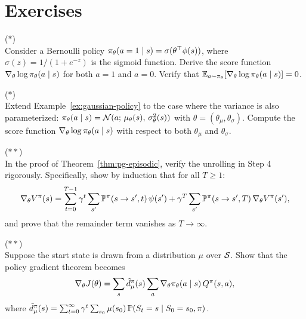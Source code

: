 \documentclass[11pt,a4paper]{article}
\begin{document}
\section{Exercises}

\begin{exercise} \textnormal{(\(*\))} \\
  Consider a Bernoulli policy $\pi_\theta(a=1 \mid s) =
  \sigma(\theta^\top \phi(s))$, where $\sigma(z) = 1/(1+e^{-z})$ is the
  sigmoid function. Derive the score function
  $\nabla_\theta \log \pi_\theta(a \mid s)$ for both $a = 1$ and
  $a = 0$. Verify that
  $\mathbb{E}_{a \sim \pi_\theta}[\nabla_\theta \log \pi_\theta(a \mid s)] = 0$.
\end{exercise}

\begin{exercise} \textnormal{(\(*\))} \\
  Extend Example~\ref{ex:gaussian-policy} to the case where the variance
  is also parameterized: $\pi_\theta(a \mid s) =
  \mathcal{N}(a;\, \mu_\theta(s),\, \sigma_\theta^2(s))$ with
  $\theta = (\theta_\mu, \theta_\sigma)$. Compute the score function
  $\nabla_\theta \log \pi_\theta(a \mid s)$ with respect to both
  $\theta_\mu$ and $\theta_\sigma$.
\end{exercise}

\begin{exercise} \textnormal{(\(**\))} \\
  In the proof of Theorem~\ref{thm:pg-episodic}, verify the unrolling in
  Step 4 rigorously. Specifically, show by induction that for all
  $T \geq 1$:
  \[
    \nabla_\theta V^{\pi}(s) = \sum_{t=0}^{T-1} \gamma^t \sum_{s'}
    \mathbb{P}^{\pi}(s \to s', t)\, \psi(s')
    + \gamma^T \sum_{s'} \mathbb{P}^{\pi}(s \to s', T)\,
    \nabla_\theta V^{\pi}(s'),
  \]
  and prove that the remainder term vanishes as $T \to \infty$.
\end{exercise}

\begin{exercise} \textnormal{(\(**\))} \\
  Suppose the start state is drawn from a distribution $\mu$ over
  $\mathcal{S}$. Show that the policy gradient theorem becomes
  \[
    \nabla_\theta J(\theta) = \sum_s \tilde{d}^{\pi}_\mu(s)
    \sum_a \nabla_\theta \pi_\theta(a \mid s)\, Q^{\pi}(s,a),
  \]
  where $\tilde{d}^{\pi}_\mu(s) = \sum_{t=0}^{\infty} \gamma^t
  \sum_{s_0} \mu(s_0)\, \mathbb{P}(S_t = s \mid S_0 = s_0, \pi)$.
\end{exercise}
\end{document}
